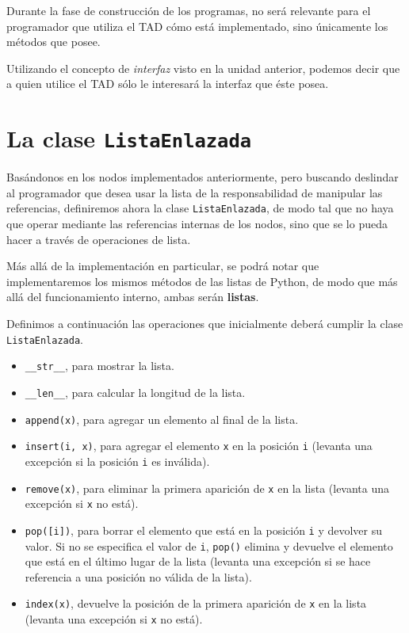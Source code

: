 Durante la fase de construcción de los programas, no será relevante para el
programador que utiliza el TAD cómo está implementado, sino únicamente los
métodos que posee.

\begin{observacion}
Utilizando el concepto de \emph{interfaz} visto en la unidad anterior, podemos
decir que a quien utilice el TAD sólo le interesará la interfaz que éste
posea.
\end{observacion}

\section{La clase {\tt ListaEnlazada}}

Basándonos en los nodos implementados anteriormente, pero buscando
deslindar al programador que desea usar la lista de la responsabilidad de
manipular las referencias, definiremos ahora la clase
\lstinline!ListaEnlazada!, de modo tal que no haya que operar mediante las
referencias internas de los nodos, sino que se lo pueda hacer a través de
operaciones de lista.

Más allá de la implementación en particular, se podrá notar que implementaremos
los mismos métodos de las listas de Python, de modo que más allá del
funcionamiento interno, ambas serán {\bf listas}. 

Definimos a continuación las operaciones que inicialmente deberá cumplir la
clase \lstinline!ListaEnlazada!.

\begin{itemize}
\item \lstinline|__str__|, para mostrar la lista.

\item \lstinline|__len__|, para calcular la longitud de la lista.

\item \lstinline|append(x)|, para agregar un elemento al final de la lista.

\item \lstinline|insert(i, x)|, para agregar el elemento \lstinline!x! en la
posición \lstinline!i! (levanta una excepción si la posición \lstinline!i! es
inválida).

\item \lstinline|remove(x)|, para eliminar la primera aparición de
\lstinline!x! en la lista (levanta una excepción si \lstinline!x! no está).

\item \lstinline|pop([i])|, para borrar el elemento que está en la posición
\lstinline!i! y devolver su valor. Si no se especifica el valor de
\lstinline!i!, \lstinline|pop()| elimina y devuelve el elemento que está en
el último lugar de la lista (levanta una excepción si se hace referencia a
una posición no válida de la lista).

\item \lstinline|index(x)|, devuelve la posición de la primera aparición de
\lstinline!x! en la lista (levanta una excepción si \lstinline!x! no está).
\end{itemize}

